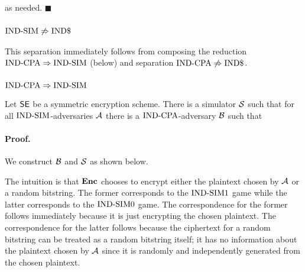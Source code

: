 as needed. $\blacksquare$

\subsubsection*{$\textnormal{IND-SIM} \not\Rightarrow \textnormal{IND\$}$}

This separation immediately follows from composing the reduction
$\textnormal{IND-CPA} \Rightarrow \textnormal{IND-SIM}$ (below) and separation
$\textnormal{IND-CPA} \not\Rightarrow \textnormal{IND\$}$.

\subsubsection*{$\textnormal{IND-CPA} \Rightarrow \textnormal{IND-SIM}$}

Let $\textnormal{\textsf{SE}}$ be a symmetric encryption scheme. There is
a simulator ${\cal S}$ such that for all $\textnormal{IND-SIM}$-adversaries ${\mathcal A}$ there is
a $\textnormal{IND-CPA}$-adversary ${\mathcal B}$ such that 

\bnm
\AdvINDSIM{\SEscheme}{\advA} \leq \AdvINDCPA{\SEscheme}{\advB}
\enm

\paragraph{Proof.}

We construct ${\mathcal B}$ and ${\cal S}$ as shown below.



The intuition is that $\textbf{Enc}$ chooses to encrypt either the plaintext chosen
by ${\mathcal A}$ or a random bitstring. The former corresponds to the $\textnormal{IND-SIM}1$
game while the latter corresponds to the $\textnormal{IND-SIM}0$ game. The correspondence
for the former follows immediately because it is just encrypting the chosen
plaintext. The correspondence for the latter follows because the ciphertext
for a random bitstring can be treated as a random bitstring itself;
it has no information about the plaintext chosen by ${\mathcal A}$ since it is
randomly and independently generated from the chosen plaintext.

